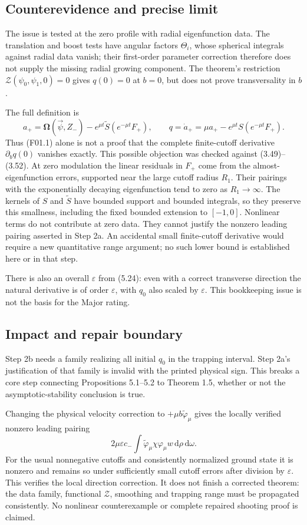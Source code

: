 \documentclass[10pt]{article}
\begin{document}
\subsection*{Counterevidence and precise limit}
The issue is tested at the zero profile with radial eigenfunction data. The translation and boost tests have angular factors \(\Theta_i\), whose spherical integrals against radial data vanish; their first-order parameter correction therefore does not supply the missing radial growing component. The theorem’s restriction \(\mathcal Z(\psi_0,\psi_1,0)=0\) gives \(q(0)=0\) at \(b=0\), but does not prove transversality in \(b\).\par
The full definition is \[a_+=\boldsymbol\Omega(\vec\psi,Z_-)-e^{\mu t}\widetilde S(e^{-\mu t}F_+),
\qquad q=\dot a_+=\mu a_+-e^{\mu t}S(e^{-\mu t}F_+).\] Thus (F01.1) alone is not a proof that the complete finite-cutoff derivative \(\partial_b q(0)\) vanishes exactly. This possible objection was checked against (3.49)–(3.52). At zero modulation the linear residuals in \(F_+\) come from the almost-eigenfunction errors, supported near the large cutoff radius \(R_1\). Their pairings with the exponentially decaying eigenfunction tend to zero as \(R_1\to\infty\). The kernels of \(S\) and \(\widetilde S\) have bounded support and bounded integrals, so they preserve this smallness, including the fixed bounded extension to \([-1,0]\). Nonlinear terms do not contribute at zero data. They cannot justify the nonzero leading pairing asserted in Step 2a. An accidental small finite-cutoff derivative would require a new quantitative range argument; no such lower bound is established here or in that step.\par
There is also an overall \(\varepsilon\) from (5.24): even with a correct transverse direction the natural derivative is of order \(\varepsilon\), with \(q_0\) also scaled by \(\varepsilon\). This bookkeeping issue is not the basis for the Major rating.\par
\subsection*{Impact and repair boundary}
Step 2b needs a family realizing all initial \(q_0\) in the trapping interval. Step 2a’s justification of that family is invalid with the printed physical sign. This breaks a core step connecting Propositions 5.1–5.2 to Theorem 1.5, whether or not the asymptotic-stability conclusion is true.\par
Changing the physical velocity correction to \(+\mu b\widetilde\varphi_\mu\) gives the locally verified nonzero leading pairing \[2\mu\varepsilon c_-\int
 \widetilde\varphi_\mu\chi\varphi_\mu w\,\mathrm d\rho\,\mathrm d\omega .\] For the usual nonnegative cutoffs and consistently normalized ground state it is nonzero and remains so under sufficiently small cutoff errors after division by \(\varepsilon\). This verifies the local direction correction. It does not finish a corrected theorem: the data family, functional \(\mathcal Z\), smoothing and trapping range must be propagated consistently. No nonlinear counterexample or complete repaired shooting proof is claimed.\par
\end{document}
